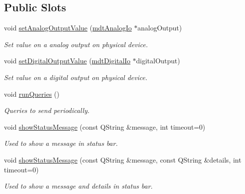 \subsection*{Public Slots}
\begin{DoxyCompactItemize}
\item 
void \hyperlink{classmdt_device_a83cdf442f4cec7261742ca5939e390a1}{setAnalogOutputValue} (\hyperlink{classmdt_analog_io}{mdtAnalogIo} $\ast$analogOutput)
\begin{DoxyCompactList}\small\item\em Set value on a analog output on physical device. \end{DoxyCompactList}\item 
void \hyperlink{classmdt_device_a93abbc706a1e6601ce947eee5e50fba6}{setDigitalOutputValue} (\hyperlink{classmdt_digital_io}{mdtDigitalIo} $\ast$digitalOutput)
\begin{DoxyCompactList}\small\item\em Set value on a digital output on physical device. \end{DoxyCompactList}\item 
void \hyperlink{classmdt_device_a14634fec6cd6bae810562b3bd88a5c05}{runQueries} ()
\begin{DoxyCompactList}\small\item\em Queries to send periodically. \end{DoxyCompactList}\item 
void \hyperlink{classmdt_device_aef41742272cbf069890ea95605f41d44}{showStatusMessage} (const QString \&message, int timeout=0)
\begin{DoxyCompactList}\small\item\em Used to show a message in status bar. \end{DoxyCompactList}\item 
void \hyperlink{classmdt_device_a52a13e5692fccb5aea1f7c3c991823f3}{showStatusMessage} (const QString \&message, const QString \&details, int timeout=0)
\begin{DoxyCompactList}\small\item\em Used to show a message and details in status bar. \end{DoxyCompactList}\end{DoxyCompactItemize}
